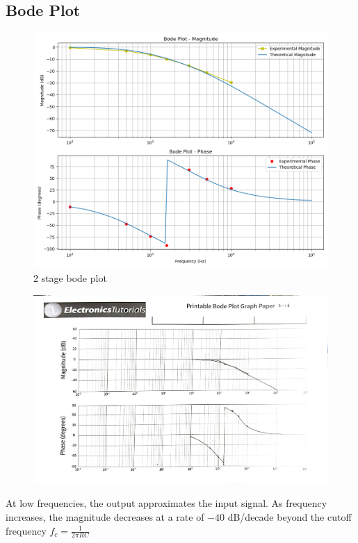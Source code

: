 \documentclass[12pt,a4paper]{report}
\begin{document}
\subsection{Bode Plot}
\begin{figure}[H] %
    \centering
    \includegraphics[width=\textwidth]{figs/2phase.png} %
    
    \caption{2 stage bode plot}
    \label{fig:bode plot}
\end{figure}
\begin{figure}
    \centering
    \includegraphics[width=\linewidth]{figs/2draw.jpg}
    
    \label{fig:enter-label}
\end{figure}
At low frequencies, the output approximates the input signal. As frequency increases, the magnitude decreases at a rate of \(-40\) dB/decade beyond the cutoff frequency \( f_c = \frac{1}{2\pi RC} \)
\end{document}
